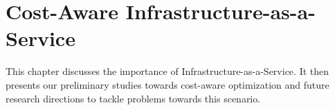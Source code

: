 \chapter{Cost-Aware Infrastructure-as-a-Service}
\label{chapter:cloud_configuration}

This chapter discusses the importance of
Infrastructure-as-a-Service.
It then presents our preliminary studies towards cost-aware optimization
and future research directions to tackle problems towards this scenario.




%
